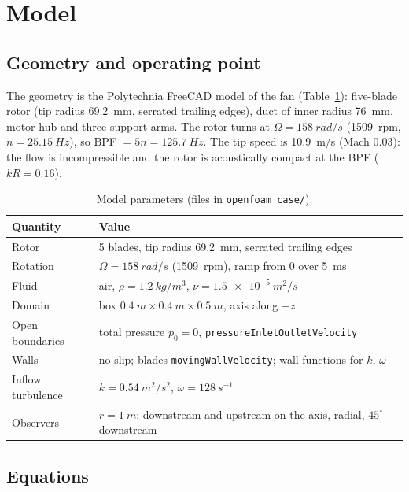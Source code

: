 \documentclass[11pt]{article}
\begin{document}
\section{Model}

\subsection{Geometry and operating point}

The geometry is the Polytechnia FreeCAD model of the fan (Table~\ref{tab:model}): five-blade rotor (tip radius
\SI{69.2}{mm}, serrated trailing edges), duct of inner radius \SI{76}{mm}, motor hub and three support arms. The rotor
turns at $\Omega=\SI{158}{rad/s}$ (\SI{1509}{rpm}, $n=\SI{25.15}{Hz}$), so BPF $=5n=\SI{125.7}{Hz}$. The tip speed
is \SI{10.9}{m/s} (Mach 0.03): the flow is incompressible and the rotor is acoustically compact at the BPF
($kR=0.16$).

\begin{table}[h]
\centering
\caption{Model parameters (files in \texttt{openfoam\_case/}).}
\label{tab:model}
\begin{tabular}{ll}
\toprule
Quantity & Value \\
\midrule
Rotor & 5 blades, tip radius \SI{69.2}{mm}, serrated trailing edges \\
Rotation & $\Omega=\SI{158}{rad/s}$ (\SI{1509}{rpm}), ramp from 0 over \SI{5}{ms} \\
Fluid & air, $\rho=\SI{1.2}{kg/m^3}$, $\nu=\SI{1.5e-5}{m^2/s}$ \\
Domain & box $\SI{0.4}{m}\times\SI{0.4}{m}\times\SI{0.5}{m}$, axis along $+z$ \\
Open boundaries & total pressure $p_0=0$, \texttt{pressureInletOutletVelocity} \\
Walls & no slip; blades \texttt{movingWallVelocity}; wall functions for $k$, $\omega$ \\
Inflow turbulence & $k=\SI{0.54}{m^2/s^2}$, $\omega=\SI{128}{s^{-1}}$ \\
Observers & $r=\SI{1}{m}$: downstream and upstream on the axis, radial, $45^\circ$ downstream \\
\bottomrule
\end{tabular}
\end{table}

\subsection{Equations}
\end{document}
